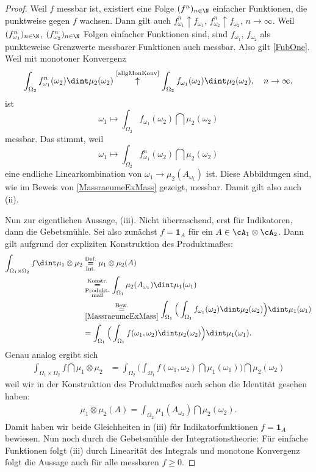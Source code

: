 \begin{proof}
	Weil $f$ messbar ist, existiert eine Folge $(f^n)_{n\in\N}$ einfacher Funktionen, die punktweise gegen $f$ wachsen. Dann gilt  auch $f_{\omega_1}^n \uparrow f_{\omega_1}$, $f_{\omega_2}^n \uparrow f_{\omega_2}$, $n\to\infty$. Weil $(f_{\omega_1}^n)_{n\in\N}$, $(f_{\omega_2}^n)_{n\in\N}$ Folgen einfacher Funktionen sind, sind $f_{\omega_1}$, $f_{\omega_2}$ als punkteweise Grenzwerte messbarer Funktionen auch messbar. Also gilt \ref{FubOne}. Weil mit monotoner Konvergenz \[ \int_{\Omega_2} f_{\omega_1}^n(\omega_2) \dint \mu_2(\omega_2) \overset{\text{\ref{allgMonKonv}}}{\uparrow} \int_{\Omega_2} f_{\omega_1}(\omega_2) \dint \mu_2(\omega_2), \quad n\to\infty,\]
	ist \[ \omega_1 \mapsto \int_{\Omega_2} f_{\omega_1}(\omega_2) \dint \mu_2(\omega_2)  \] messbar. Das stimmt, weil 
	\[ \omega_1\mapsto \int_{\Omega_2} f_{\omega_1}^n(\omega_2) \dint \mu_2(\omega_2) \] eine endliche Linearkombination von $\omega_1 \to \mu_2(A_{\omega_1})$ ist. Diese Abbildungen sind, wie im Beweis von \ref{MassraeumeExMass} gezeigt, messbar. Damit gilt also auch (ii).\smallskip
	
	Nun zur eigentlichen Aussage, (iii). Nicht \"uberraschend, erst f\"ur Indikatoren, dann die Gebetsm\"uhle. Sei also zun\"achst $f = \mathbf{1}_A$ f\"ur ein $A \in \cA_1 \otimes \cA_2$. Dann gilt aufgrund der expliziten Konstruktion des Produktma\ss es:
		\begin{align*}
			\int_{\Omega_1 \times \Omega_2} f \dint \mu_1\otimes \mu_2 &
			 \overset{\text{Def.}}{\underset{\text{Int.}}{=}} \mu_1\otimes \mu_2(A)\\
			 & \underset{\substack{\text{Produkt-}\\
			 \text{maß}}}{\overset{\text{Konstr.}}{=}} \int_{\Omega_1} \mu_2(A_{\omega_1}) \dint \mu_1(\omega_1)\\
			&\overset{\text{Bew.}}{\underset{\ref{MassraeumeExMass}}{=}} \int_{\Omega_1} \Big( \int_{\Omega_1} f_{\omega_1}(\omega_2) \dint \mu_2(\omega_2) \Big) \dint \mu_1(\omega_1)\\
			& = 	\int_{\Omega_1} \Big( \int_{\Omega_1} f(\omega_1,\omega_2) \dint \mu_2(\omega_2) \Big) \dint \mu_1(\omega_1).
		\end{align*}
		Genau analog ergibt sich
		\begin{align*}
			\int_{\Omega_1 \times \Omega_2} f \dint \mu_1\otimes \mu_2
			& = 	\int_{\Omega_2} \Big( \int_{\Omega_1} f(\omega_1,\omega_2) \dint \mu_1(\omega_1) \Big) \dint \mu_2(\omega_2)
		\end{align*}
	weil wir in der Konstruktion des Produktma\ss es auch schon die Identit\"at gesehen haben:
	\begin{align*}
		\mu_1\otimes \mu_2(A)=  \int_{\Omega_2} \mu_1(A_{\omega_2}) \dint \mu_2(\omega_2).
	\end{align*}
	Damit haben wir beide Gleichheiten in (iii) f\"ur Indikatorfunktionen $f = \mathbf{1}_A$ bewiesen. Nun noch durch die Gebetsm\"uhle der Integrationstheorie: F\"ur einfache Funktionen folgt (iii) durch Linearit\"at des Integrals und monotone Konvergenz folgt die Aussage auch f\"ur alle messbaren $f\geq 0$.
\end{proof}

